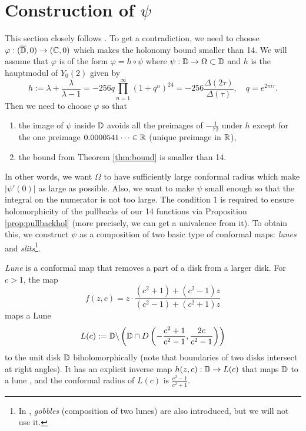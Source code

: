 \section{Construction of $\psi$}
\label{sec:psi}

This section closely follows \cite[Appendix A]{calegari2024linear}.
To get a contradiction, we need to choose $\varphi: (\overline{\mathbb{D}},0) \to (\mathbb{C}, 0)$ which makes the holonomy bound smaller than 14.
We will assume that $\varphi$ is of the form $\varphi = h \circ \psi$ where $\psi: \mathbb{D} \to \Omega \subset \mathbb{D}$ and $h$ is the hauptmodul of $Y_0(2)$ given by
\begin{equation}
\label{eqn:h}
     h := \lambda + \frac{\lambda}{\lambda - 1} = -256 q \prod_{n=1}^{\infty} (1 + q^n)^{24} = -256 \frac{\Delta(2\tau)}{\Delta(\tau)}, \quad q = e^{2\pi i \tau}.
\end{equation}
Then we need to choose $\varphi$ so that
\begin{enumerate}
    \item the image of $\psi$ inside $\mathbb{D}$ avoids all the preimages of $-\frac{1}{72}$ under $h$ except for the one preimage $0.0000541\dots \in \mathbb{R}$ (unique preimage in $\mathbb{R}$),
    \item the bound from Theorem \ref{thm:bound} is smaller than 14.
\end{enumerate}
In other words, we want $\Omega$ to have sufficiently large conformal radius which make $|\psi'(0)|$ as large as possible.
Also, we want to make $\psi$ small enough so that the integral on the numerator is not too large.
The condition 1 is required to ensure holomorphicity of the pullbacks of our 14 functions via Proposition \ref{prop:pullbackhol} (more precisely, we can get a univalence from it).
To obtain this, we construct $\psi$ as a composition of two basic type of conformal maps: \emph{lunes} and \emph{slits}\footnote{In \cite{calegari2024linear}, \emph{gobbles} (composition of two lunes) are also introduced, but we will not use it.}.

\emph{Lune} is a conformal map that removes a part of a disk from a larger disk.
For $c > 1$, the map
$$
    f(z, c) = z \cdot \frac{(c^2 + 1) + (c^2 - 1)z}{(c^2 - 1) + (c^2 + 1)z}
$$
maps a Lune
$$
    L(c) := \mathbb{D} \backslash \left(\mathbb{D} \cap D \left(-\frac{c^2 + 1}{c^2 - 1}, \frac{2c}{c^2 - 1}\right)\right)
$$
to the unit disk $\mathbb{D}$ biholomorphically (note that boundaries of two disks intersect at right angles).
It has an explicit inverse map $h(z, c): \mathbb{D} \to L(c)$ that maps $\mathbb{D}$ to a lune \cite[Equation A.1.1]{calegari2024linear}, and the conformal radius of $L(c)$ is $\frac{c^2 - 1}{c^2 + 1}$.

